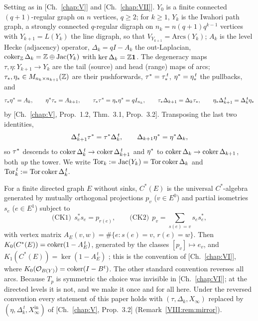 Setting as in [Ch.~\ref{chap:V}] and [Ch.~\ref{chap:VII}]. $Y_0$ is a finite connected $(q{+}1)$-regular graph on $n$
vertices, $q\ge2$; for $k\ge1$, $Y_k$ is the Iwahori path graph, a strongly connected
$q$-regular digraph on $n_k=n(q{+}1)q^{k-1}$ vertices with $Y_{k+1}=L(Y_k)$ the line
digraph, so that $V_{Y_{k+1}}=\mathrm{Arcs}(Y_k)$; $A_k$ is the level Hecke (adjacency)
operator, $\Delta_k=qI-A_k$ the out-Laplacian, $\operatorname{coker}_{\mathbb{Z}}\Delta_k=\mathbb{Z}\oplus\operatorname{Jac}(Y_k)$
with $\ker\Delta_k=\mathbb{Z}\mathbf1$. The degeneracy maps $\tau,\eta\colon Y_{k+1}\to Y_k$
are the tail (source) and head (range) maps of arcs; $\tau_*,\eta_*\in M_{n_k\times n_{k+1}}(\mathbb{Z})$
are their pushforwards, $\tau^*=\tau_*^{\,t}$, $\eta^*=\eta_*^{\,t}$ the pullbacks, and
\begin{equation}\label{VIII:eq:calculus}
\tau_*\eta^*=A_k,\qquad \eta^*\tau_*=A_{k+1},\qquad \tau_*\tau^*=\eta_*\eta^*=qI_{n_k},\qquad
\tau_*\Delta_{k+1}=\Delta_k\tau_*,\qquad \eta_*\Delta_{k+1}^{\,t}=\Delta_k^{\,t}\eta_*
\end{equation}
by [Ch.~\ref{chap:V}, Prop.~1.2, Thm.~3.1, Prop.~3.2]. Transposing the last two identities,
\begin{equation}\label{VIII:eq:pullbacks}
\Delta_{k+1}^{\,t}\tau^*=\tau^*\Delta_k^{\,t},\qquad \Delta_{k+1}\eta^*=\eta^*\Delta_k ,
\end{equation}
so $\tau^*$ descends to $\operatorname{coker}\Delta_k^{\,t}\to\operatorname{coker}\Delta_{k+1}^{\,t}$ and $\eta^*$ to
$\operatorname{coker}\Delta_k\to\operatorname{coker}\Delta_{k+1}$, both \emph{up} the tower. We write
$\operatorname{Tor}_k:=\operatorname{Jac}(Y_k)=\operatorname{Tor}\operatorname{coker}\Delta_k$ and $\operatorname{Tor}_k^{\,t}:=\operatorname{Tor}\operatorname{coker}\Delta_k^{\,t}$.

\begin{convention}\label{VIII:conv}
For a finite directed graph $E$ without sinks, $C^*(E)$ is the universal $C^*$-algebra
generated by mutually orthogonal projections $p_v$ ($v\in E^0$) and partial isometries
$s_e$ ($e\in E^1$) subject to
\[
\text{(CK1)}\ \ s_e^*s_e=p_{r(e)},\qquad
\text{(CK2)}\ \ p_v=\sum_{s(e)=v}s_es_e^* ,
\]
with vertex matrix $A_E(v,w)=\#\{e:s(e)=v,\,r(e)=w\}$. Then $K_0(C^*(E))=\operatorname{coker}(1-A_E^{\,t})$,
generated by the classes $[p_v]\mapsto e_v$, and $K_1(C^*(E))=\ker(1-A_E^{\,t})$
\cite[Thm.~7.16]{R}; this is the convention of [Ch.~\ref{chap:VI}], where $K_0(\mathcal{O}_{B(Y)})=\operatorname{coker}(I-B^t)$.
The other standard convention reverses all arcs. Because $T_p$ is symmetric the choice
was invisible in [Ch.~\ref{chap:VI}]; at the directed levels it is not, and we make it once and for all
here. Under the reversed convention every statement of this paper holds with
$(\tau,\Delta_k,X_\infty)$ replaced by $(\eta,\Delta_k^{\,t},X_\infty^{\mathrm{in}})$
of [Ch.~\ref{chap:V}, Prop.~3.2] (Remark~\ref{VIII:rem:mirror}).
\end{convention}

